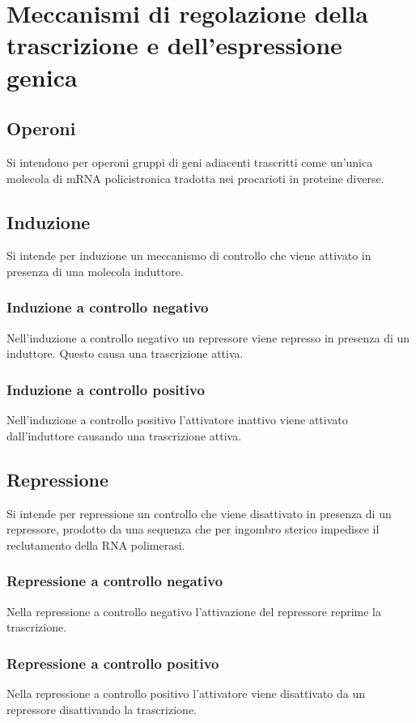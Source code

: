 \section{Meccanismi di regolazione della trascrizione e dell'espressione genica}

	\subsection{Operoni}
	Si intendono per operoni gruppi di geni adiacenti trascritti come un'unica molecola di mRNA policistronica tradotta nei procarioti in proteine diverse.

	\subsection{Induzione}
	Si intende per induzione un meccanismo di controllo che viene attivato in presenza di una molecola induttore.

		\subsubsection{Induzione a controllo negativo}
		Nell'induzione a controllo negativo un repressore viene represso in presenza di  un induttore.
		Questo causa una trascrizione attiva.

		\subsubsection{Induzione a controllo positivo}
		Nell'induzione a controllo positivo l'attivatore inattivo viene attivato dall'induttore causando una trascrizione attiva.

	\subsection{Repressione}
	Si intende per repressione un controllo che viene disattivato in presenza di un repressore, prodotto da una sequenza che per ingombro sterico impedisce il reclutamento della RNA polimerasi.

		\subsubsection{Repressione a controllo negativo}
		Nella repressione a controllo negativo l'attivazione del repressore reprime la trascrizione.

		\subsubsection{Repressione a controllo positivo}
		Nella repressione a controllo positivo l'attivatore viene disattivato da un repressore disattivando la trascrizione.

